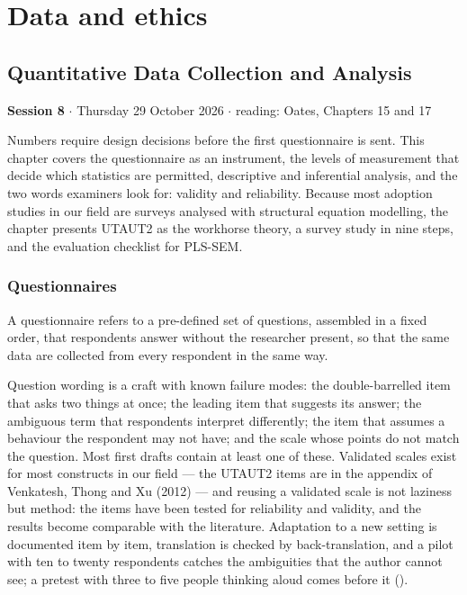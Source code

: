 \documentclass[11pt,a4paper,british,twoside=false,headings=small,chapterprefix=false,numbers=noenddot]{scrbook}
\newenvironment{block}[1]{\begin{tcolorbox}[scriptbox, title={#1}]}{\end{tcolorbox}}
\newcommand{\sessionhead}[2]{\begin{tcolorbox}[enhanced, colback=uiamutedblue, colframe=uiamutedblue, arc=1.5pt, left=6pt, right=6pt]
  \small \textbf{Session #1} \;$\cdot$\; #2\end{tcolorbox}}
\begin{document}
\part{Data and ethics}
\chapter{Quantitative Data Collection and Analysis}
\label{ch:8}
\sessionhead{8}{Thursday 29 October 2026 \;$\cdot$\; reading: Oates, Chapters 15 and 17}

Numbers require design decisions before the first questionnaire is sent. This chapter covers the questionnaire as an instrument, the levels of measurement that decide which statistics are permitted, descriptive and inferential analysis, and the two words examiners look for: validity and reliability. Because most adoption studies in our field are surveys analysed with structural equation modelling, the chapter presents UTAUT2 as the workhorse theory, a survey study in nine steps, and the evaluation checklist for PLS-SEM.


\section{Questionnaires}

\begin{block}{Questionnaire}
A questionnaire refers to a pre-defined set of questions, assembled in a fixed order, that respondents answer without the researcher present, so that the same data are collected from every respondent in the same way.
\end{block}

Question wording is a craft with known failure modes: the double-barrelled item that asks two things at once; the leading item that suggests its answer; the ambiguous term that respondents interpret differently; the item that assumes a behaviour the respondent may not have; and the scale whose points do not match the question. Most first drafts contain at least one of these. Validated scales exist for most constructs in our field --- the UTAUT2 items are in the appendix of Venkatesh, Thong and Xu (2012) --- and reusing a validated scale is not laziness but method: the items have been tested for reliability and validity, and the results become comparable with the literature. Adaptation to a new setting is documented item by item, translation is checked by back-translation, and a pilot with ten to twenty respondents catches the ambiguities that the author cannot see; a pretest with three to five people thinking aloud comes before it ().
\end{document}
